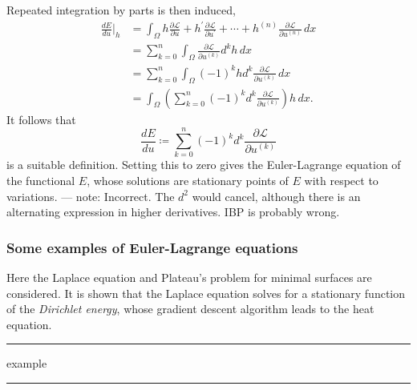\documentclass[11pt,a4paper]{memoir}
\newcommand{\fancyL}{\mathcal{L}}
\newcommand{\om}{\Omega}
\newcommand{\pom}{{\partial\Omega}}
\newcommand{\diver}{\text{div}}
\newcommand{\todo}[1]{\vskip 0.1in \hrule \vskip 0.03in {#1} \vskip 0.03in \hrule \vskip 0.1in}
\begin{document}
Repeated integration by parts is then induced,
\begin{align*}
    \frac{dE}{du}\Big|_h &=
        \int_\Omega h\frac{\partial\mathcal{L}}{\partial u}
            + h^\prime\frac{\partial\fancyL}{\partial u^\prime}
            + \cdots
            + h^{(n)}\frac{\partial\fancyL}{\partial u^{(n)}}\,dx \\
    &= \sum_{k=0}^n \int_\om \frac{\partial\mathcal L}{\partial u^{(k)}} d^k h \,dx \\
    &= \sum_{k=0}^n \int_\om (-1)^k h d^k \frac{\partial\mathcal L}{\partial u^{(k)}}\,dx \\
    &= \int_\om \left(\sum_{k=0}^n (-1)^k d^k \frac{\partial\mathcal L}{\partial u^{(k)}}\right)h\,dx.
\end{align*}
It follows that
\begin{equation}\label{functional_gradient_zero_boundary}
    \frac{dE}{du} \coloneqq \sum_{k=0}^n (-1)^k d^k \frac{\partial\mathcal L}{\partial u^{(k)}}
\end{equation}
is a suitable definition. Setting this to zero gives the Euler-Lagrange equation of the functional $E$,
whose solutions are stationary points of $E$ with respect to variations.
--- note: Incorrect. The $d^2$ would cancel, although there is an alternating expression in higher derivatives. IBP is probably wrong.




\subsubsection{Some examples of Euler-Lagrange equations}
Here the Laplace equation and Plateau's problem for minimal surfaces are considered.
It is shown that the Laplace equation solves for a stationary function of the \textit{Dirichlet energy},
whose gradient descent algorithm leads to the heat equation.
\todo{example}
\end{document}
